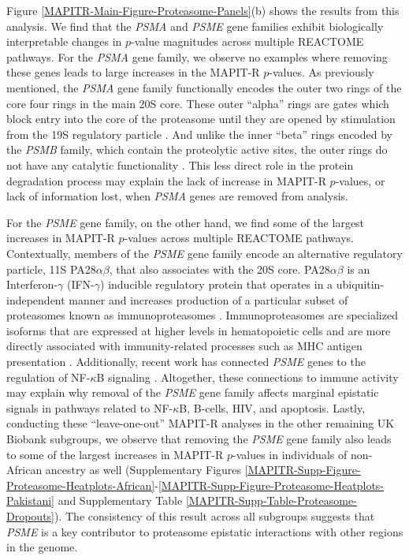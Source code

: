 \documentclass[10pt]{article}
\begin{document}
Figure \ref{MAPITR-Main-Figure-Proteasome-Panels}(b) shows the results from this analysis. We find that the \textit{PSMA} and \textit{PSME} gene families exhibit biologically interpretable changes in $p$-value magnitudes across multiple REACTOME pathways. For the \textit{PSMA} gene family, we observe no examples where removing these genes leads to large increases in the MAPIT-R $p$-values. As previously mentioned, the \textit{PSMA} gene family functionally encodes the outer two rings of the core four rings in the main 20S core. These outer ``alpha'' rings are gates which block entry into the core of the proteasome until they are opened by stimulation from the 19S regulatory particle \cite{Groll2000,Kohler2001,Smith2007}. And unlike the inner ``beta'' rings encoded by the \textit{PSMB} family, which contain the proteolytic active sites, the outer rings do not have any catalytic functionality \cite{Baumeister1998,Groll1999}. This less direct role in the protein degradation process may explain the lack of increase in MAPIT-R $p$-values, or lack of information lost, when \textit{PSMA} genes are removed from analysis. 
 
For the \textit{PSME} gene family, on the other hand, we find some of the largest increases in MAPIT-R $p$-values across multiple REACTOME pathways. Contextually, members of the \textit{PSME} gene family encode an alternative regulatory particle, 11S PA28$\alpha\beta$, that also associates with the 20S core. PA28$\alpha\beta$ is an Interferon-$\gamma$ (IFN-$\gamma$) inducible regulatory protein that operates in a ubiquitin-independent manner and increases production of a particular subset of proteasomes known as immunoproteasomes \cite{Groettrup1996,de2011,Raule2014,Murata2018}. Immunoproteasomes are specialized isoforms that are expressed at higher levels in hematopoietic cells and are more directly associated with immunity-related processes such as MHC antigen presentation \cite{Ferrington2012,Basler2013,McCarthy2015}. Additionally, recent work has connected \textit{PSME} genes to the regulation of NF-$\kappa$B signaling \cite{Sun2016,Mitchell2019}. Altogether, these connections to immune activity may explain why removal of the \textit{PSME} gene family affects marginal epistatic signals in pathways related to NF-$\kappa$B, B-cells, HIV, and apoptosis. Lastly, conducting these ``leave-one-out'' MAPIT-R analyses in the other remaining UK Biobank subgroups, we observe that removing the \textit{PSME} gene family also leads to some of the largest increases in MAPIT-R $p$-values in individuals of non-African ancestry as well (Supplementary Figures \ref{MAPITR-Supp-Figure-Proteasome-Heatplots-African}-\ref{MAPITR-Supp-Figure-Proteasome-Heatplots-Pakistani} and Supplementary Table \ref{MAPITR-Supp-Table-Proteasome-Dropouts}). The consistency of this result across all subgroups suggests that \textit{PSME} is a key contributor to proteasome epistatic interactions with other regions in the genome. 
\end{document}
